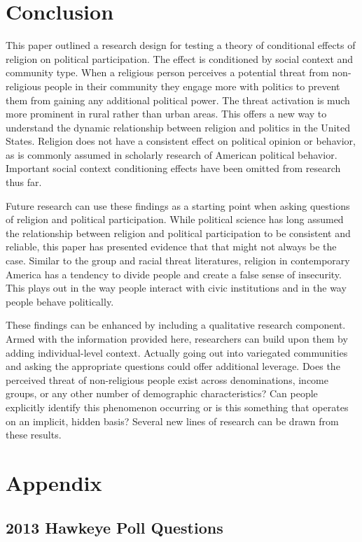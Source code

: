 \documentclass{article}
\begin{document}
\section*{Conclusion}
This paper outlined a research design for testing a theory of conditional effects of religion on political participation.  The effect is conditioned by social context and community type.  When a religious person perceives a potential threat from non-religious people in their community they engage more with politics to prevent them from gaining any additional political power. The threat activation is much more prominent in rural rather than urban areas.  This offers a new way to understand the dynamic relationship between religion and politics in the United States.  Religion does not have a consistent effect on political opinion or behavior, as is commonly assumed in scholarly research of American political behavior.  Important social context conditioning effects have been omitted from research thus far.

Future research can use these findings as a starting point when asking questions of religion and political participation.  While political science has long assumed the relationship between religion and political participation to be consistent and reliable, this paper has presented evidence that that might not always be the case.  Similar to the group and racial threat literatures, religion in contemporary America has a tendency to divide people and create a false sense of insecurity.  This plays out in the way people interact with civic institutions and in the way people behave politically. 

These findings can be enhanced by including a qualitative research component.  Armed with the information provided here, researchers can build upon them by adding individual-level context.  Actually going out into variegated communities and asking the appropriate questions could offer additional leverage.  Does the perceived threat of non-religious people exist across denominations, income groups, or any other number of demographic characteristics?  Can people explicitly identify this phenomenon occurring or is this something that operates on an implicit, hidden basis?  Several new lines of research can be drawn from these results.  

\section*{Appendix}
\singlespacing
\subsection{2013 Hawkeye Poll Questions}
\end{document}
